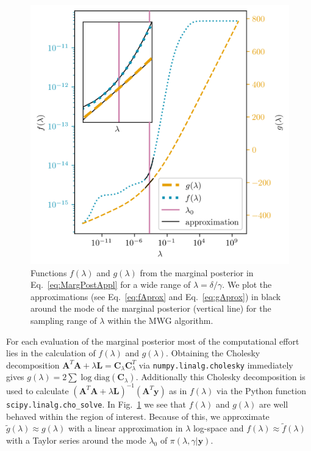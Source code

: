 \begin{figure}[th!]
	\centering
	\includegraphics{f_and_g_phd.png}
	\caption[Functions $f(\lambda)$ and $g(\lambda)$ of 2D marginal posterior.]{Functions $f(\lambda)$ and $g(\lambda)$ from the marginal posterior in Eq.~\ref{eq:MargPostAppl} for a wide range of $\lambda = \delta / \gamma$. We plot the approximations (see Eq.~\ref{eq:fAprox} and Eq.~\ref{eq:gAprox}) in black around the mode of the marginal posterior (vertical line) for the sampling range of $\lambda$ within the MWG algorithm.}
	\label{fig:fandg}
\end{figure}
For each evaluation of the marginal posterior most of the computational effort lies in the calculation of $f(\lambda)$ and $g(\lambda)$.
Obtaining the Cholesky decomposition $\bm{A}^T  \bm{A} + \lambda \bm{L} = \bm{C}_{\lambda} \bm{C}_{\lambda}^T$ via \texttt{numpy.linalg.cholesky} immediately gives $g(\lambda) = 2 \sum \log \text{diag}(\bm{C}_{\lambda}) $.
Additionally this Cholesky decomposition is used to calculate $(\bm{A}^T  \bm{A} + \lambda \bm{L})^{-1} (\bm{A}^T \bm{y})$ as in $f(\lambda)$ via the Python function \texttt{scipy.linalg.cho\_solve}.
In  Fig.~\ref{fig:fandg} we see that $f(\lambda)$ and $g(\lambda)$ are well behaved within the region of interest.
Because of this, we approximate $\tilde{g}(\lambda) \approx g(\lambda)$ with a linear approximation in $\lambda$ log-space and $f(\lambda) \approx \tilde{f}(\lambda)$ with a Taylor series around the mode $\lambda_0$ of $\pi(\lambda, \gamma | \bm{y})$.
